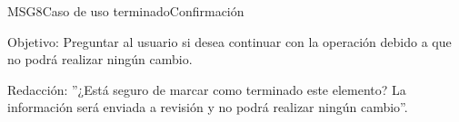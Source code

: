 \begin{mensaje}{MSG8}{Caso de uso terminado}{Confirmación}
	\item [Objetivo:] Preguntar al usuario si desea continuar con la operación debido a que no podrá realizar ningún cambio.
	\item[Redacción:] ''¿Está seguro de marcar como terminado este elemento? La información será enviada a revisión y no podrá realizar ningún cambio''.
\end{mensaje}
